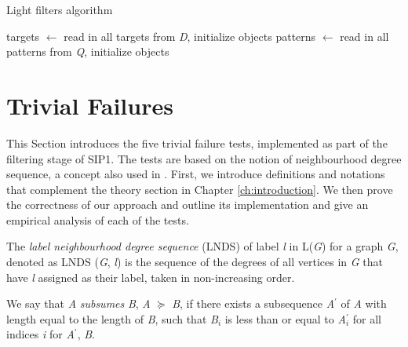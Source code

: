 \documentclass{l4proj}
\begin{document}
\begin{algorithm}
\centering
\caption{Light filters algorithm}
\label{algo:roughSIP}
\begin{algorithmic}[1]
\State targets $\gets$ read in all targets from \emph{D}, initialize objects
\State patterns $\gets$ read in all patterns from \emph{Q}, initialize objects
		 
    	\EndIf
    \EndFor
\EndFor
\EndProcedure
\end{algorithmic}
\end{algorithm}

\section{Trivial Failures}
\label{sec:trivialFails}

This Section introduces the five trivial failure tests, implemented as part of the filtering stage of SIP1. The tests are based on the notion of neighbourhood degree sequence, a concept also used in \cite{Solnon:2010}. First, we introduce definitions and notations that complement the theory section in Chapter \ref{ch:introduction}. We then prove the correctness of our approach and outline its implementation and give an empirical analysis of each of the tests.

The \emph{label neighbourhood degree sequence} (LNDS) of label \emph{l} in L(\emph{G}) for a graph \emph{G}, denoted as LNDS (\emph{G}, \emph{l}) is the sequence of the degrees of all vertices in \emph{G} that have \emph{l} assigned as their label, taken in non-increasing order.


We say that \emph{A} \emph{subsumes} \emph{B}, \emph{A} $\succeq$ \emph{B}, if there exists a subsequence \emph{A$^\prime$} of \emph{A} with length equal to the length of \emph{B}, such that \emph{B$_{i}$} is less than or equal to \emph{A$_{i}^\prime$} for all indices \emph{i} for \emph{A$^\prime$}, \emph{B}.
\end{document}
